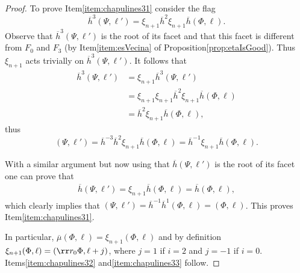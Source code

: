 \documentclass[final]{amsart}
\theoremstyle{plain}
\theoremstyle{definition}
\theoremstyle{remark}
\numberwithin{equation}{section}
\renewcommand{\{}{\lbrace}
\renewcommand{\}}{\rbrace}
\renewcommand{\bar}{\overline}
\newcommand{\kng}{{h}}
\newcommand{\etab}{\bar{\kng}}
\newcommand{\mub}{\bar{\mu}}
\newcommand{\te}{\xi}
\begin{document}
\begin{proof}
To prove Item\nobreakspace \ref {item:chapulines31} consider the flag
\[
    \etab^3(\Psi,\ell') = \te_{n+1} \etab^2 \te_{n+1} \etab (\Phi,\ell).
\]
Observe that $\etab^3(\Psi,\ell')$ is the root of its facet and that this facet is different from $F_0$ and $F_3$ (by Item\nobreakspace \ref {item:esVecina} of Proposition\nobreakspace \ref {prop:etaIsGood}).
Thus $\te_{n+1}$ acts trivially on $\etab^3(\Psi,\ell')$. It follows that
\[\begin{aligned}
\etab^{3}(\Psi,\ell')
&=\te_{n+1} \etab^3(\Psi,\ell') \\
&= \te_{n+1} \te_{n+1} \etab^2 \te_{n+1} \etab (\Phi,\ell) \\
&= \etab^2 \te_{n+1} \etab (\Phi,\ell),
\end{aligned}\]
thus
\[
(\Psi,\ell')
= \etab^{-3} \etab^{2} \te_{n+1} \etab (\Phi,\ell)
= \etab^{-1} \te_{n+1} \etab (\Phi,\ell).
\]

With a similar argument but now using that $\etab(\Psi,\ell')$ is the root of its facet one can prove that
\begin{align}
    \etab(\Psi,\ell') = \te_{n+1} \etab (\Phi,\ell) = \etab (\Phi,\ell),
\end{align}
which clearly implies that $(\Psi,\ell') = \etab^{-1}\etab^1 (\Phi,\ell) = (\Phi,\ell)$. 
This proves Item\nobreakspace \ref {item:chapulines31}.

In particular, $\mub(\Phi,\ell) = \te_{n+1}(\Phi,\ell)$ and by definition $\te_{n+1}(\Phi,\ell) = (\rr r_0 \Phi,\ell+j)$, where $j=1$ if $i=2$ and $j=-1$ if $i=0$.
Items\nobreakspace \ref {item:chapulines32} and\nobreakspace  \ref {item:chapulines33} follow.



\end{proof}
\end{document}
